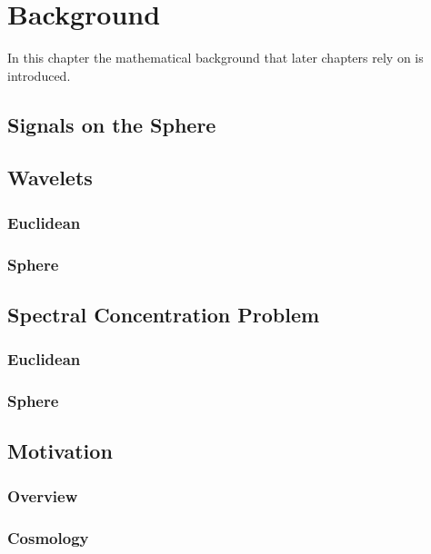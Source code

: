 \chapter{Background}\label{sec:chapter2}

In this chapter the mathematical background that later chapters rely on is introduced.

\section{Signals on the Sphere}



\section{Wavelets}

\subsection{Euclidean}

\subsection{Sphere}

\section{Spectral Concentration Problem}

\subsection{Euclidean}

\subsection{Sphere}



\section{Motivation}

\subsection{Overview}

\subsection{Cosmology}

